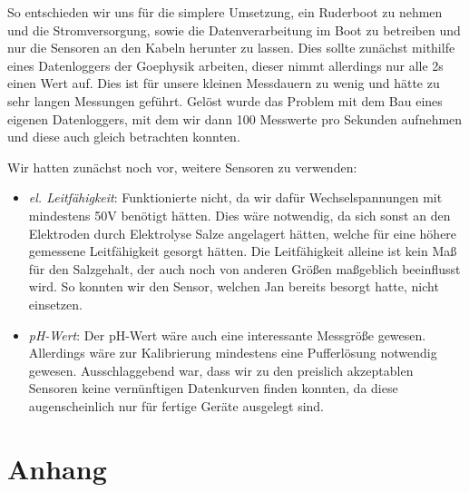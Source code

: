 \documentclass[12pt,a4paper,titlepage,headinclude,bibtotoc]{scrartcl}
\numberwithin{equation}{subsection}
\begin{document}
So entschieden wir uns für die simplere Umsetzung, ein Ruderboot zu nehmen und die Stromversorgung, sowie die Datenverarbeitung im Boot zu betreiben und nur die Sensoren an den Kabeln herunter zu lassen.
Dies sollte zunächst mithilfe eines Datenloggers der Goephysik arbeiten, dieser nimmt allerdings nur alle 2\si{\second} einen Wert auf.
Dies ist für unsere kleinen Messdauern zu wenig und hätte zu sehr langen Messungen geführt.
Gelöst wurde das Problem mit dem Bau eines eigenen Datenloggers, mit dem wir dann 100 Messwerte pro Sekunden aufnehmen und diese auch gleich betrachten konnten.


Wir hatten zunächst noch vor, weitere Sensoren zu verwenden:
\begin{itemize}
	\item \textit{el. Leitfähigkeit}: Funktionierte nicht, da wir dafür Wechselspannungen mit mindestens 50V benötigt hätten.
		Dies wäre notwendig, da sich sonst an den Elektroden durch Elektrolyse Salze angelagert hätten, welche für eine höhere gemessene Leitfähigkeit gesorgt hätten.
		Die Leitfähigkeit alleine ist kein Maß für den Salzgehalt, der auch noch von anderen Größen maßgeblich beeinflusst wird.
		So konnten wir den Sensor, welchen Jan bereits besorgt hatte, nicht einsetzen.
	\item \textit{pH-Wert}: Der pH-Wert wäre auch eine interessante Messgröße gewesen.
		Allerdings wäre zur Kalibrierung mindestens eine Pufferlösung notwendig gewesen.
		Ausschlaggebend war, dass wir zu den preislich akzeptablen Sensoren keine vernünftigen Datenkurven finden konnten, da diese augenscheinlich nur für fertige Geräte ausgelegt sind.
\end{itemize}

\newpage
\printbibliography[heading=bibintoc]
\newpage


\appendix
{}
\setcounter{page}{1}
\setcounter{footnote}{0}
\section{Anhang}
\end{document}
